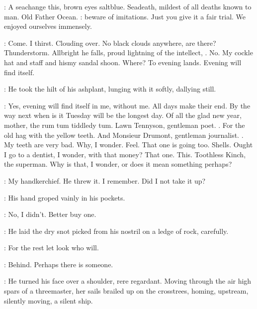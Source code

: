 \StephenInt:
A seachange this, brown eyes saltblue.
Seadeath, mildest of all deaths known to man.
Old Father Ocean.
:
beware of imitations.
Just you give it a fair trial.
We enjoyed ourselves immensely.

\StephenInt:
Come.
I thirst.
Clouding over.
No black clouds anywhere, are there?
Thunderstorm.
Allbright he falls, proud lightning of the intellect,
.
No.
My cockle hat and staff and hismy sandal shoon.
Where?
To evening lands.
Evening will find itself.

:
He took the hilt of his ashplant,
lunging with it softly, dallying still.

\StephenInt:
Yes, evening will find itself in me,
without me.
All days make their end.
By the way next when is it Tuesday
will be the longest day.
Of all the glad new year,
mother, the rum tum tiddledy tum.
Lawn Tennyson, gentleman poet.
.
For the old hag with the yellow teeth.
And Monsieur Drumont,
gentleman journalist.
.
My teeth are very bad.
Why, I wonder.
Feel.
That one is going too.
Shells.
Ought I go to a dentist, I wonder, with that money?
That one.
This.
Toothless Kinch, the superman.
Why is that, I wonder,
or does it mean something perhaps?

\StephenInt:
My handkerchief.
He threw it.
I remember.
Did I not take it up?

:
His hand groped vainly in his pockets.

\StephenInt:
No, I didn't.
Better buy one.

:
He laid the dry snot picked from his nostril
on a ledge of rock,
carefully.

\StephenInt:
For the rest let look who will.

\StephenInt:
Behind.
Perhaps there is someone.

:
He turned his face over a shoulder, rere regardant.
Moving through the air high spars of a threemaster,
her sails brailed up on the crosstrees,
homing, upstream, silently moving,
a silent ship.


